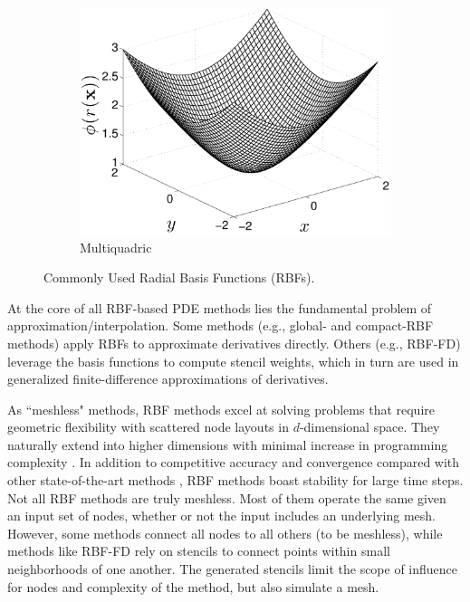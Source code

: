 \documentclass[11pt]{report}
\begin{document}
\begin{figure}[ht]
\begin{subfigure}[b]{0.25\textwidth}
		\includegraphics[width=1.0\textwidth]{../figures/paper1/figures/mq_rbf2d-eps-converted-to.pdf} 
		\caption{Multiquadric}
	\end{subfigure} 
    \caption{Commonly Used Radial Basis Functions (RBFs).}
    \label{fig:rbfs}
\end{figure}

At the core of all RBF-based PDE methods lies the fundamental problem of approximation/interpolation. Some methods (e.g., global- and compact-RBF methods) apply RBFs to approximate derivatives directly. Others (e.g., RBF-FD) leverage the basis functions to compute stencil weights, which in turn are used in generalized finite-difference approximations of derivatives. 

As ``meshless" methods, RBF methods excel at solving problems that require geometric flexibility with scattered node layouts in $d$-dimensional space. They naturally extend into higher dimensions with minimal increase in programming complexity \cite{FlyerWright07,WrightFlyerYuen10}. In addition to competitive accuracy and convergence compared with other state-of-the-art methods \cite{FlyerWright07, FlyerWright09, FlyerLehto10, WrightFlyerYuen10, FlyerFornberg11}, RBF methods boast stability for large time steps. Not all RBF methods are truly meshless. Most of them operate the same given an input set of nodes, whether or not the input includes an underlying mesh. However, some methods connect all nodes to all others (to be meshless), while methods like RBF-FD rely on stencils to connect points within small neighborhoods of one another. The generated stencils limit the scope of influence for nodes and complexity of the method, but also simulate a mesh. 
\end{document}
